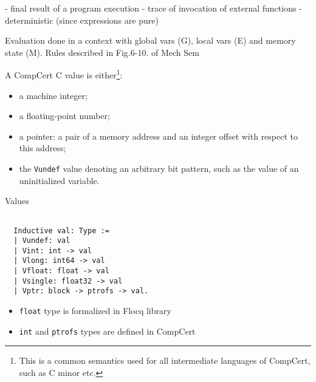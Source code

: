 \documentclass{beamer}
\begin{document}
   \begin{frame}
    
- final result of a program execution
- trace of invocation of external functions
- deterministic (since expressions are pure)

Evaluation done in a context with global vars (G), local vars (E) and memory state (M). Rules described in Fig.6-10. of Mech Sem
    \end{frame}

  \begin{frame}
    A CompCert C value is either\footnote{This is a common semantics used for all intermediate languages of CompCert, such as C minor etc.}:
    \begin{itemize}
    
\item a machine integer;
\item a floating-point number;
\item a pointer: a pair of a memory address and an integer offset with respect
  to this address;
\item the \texttt{Vundef} value denoting an arbitrary bit pattern, such as the
  value of an uninitialized variable.
 \end{itemize}
\end{frame}

\begin{frame}[t,fragile]{Values}
  
\begin{lstlisting}[language=Coq]

  Inductive val: Type :=
  | Vundef: val
  | Vint: int -> val
  | Vlong: int64 -> val
  | Vfloat: float -> val
  | Vsingle: float32 -> val
  | Vptr: block -> ptrofs -> val.
\end{lstlisting}

\begin{itemize}
\item \texttt{float} type is formalized in Flocq library
\item \texttt{int} and \texttt{ptrofs} types are defined in CompCert 
\end{itemize}
  
\end{frame}  
\end{document}
